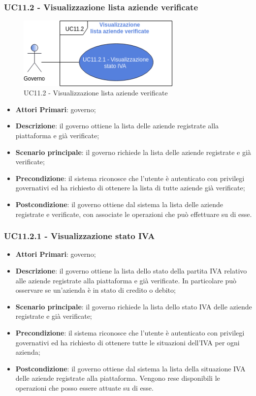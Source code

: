  \subsubsection{UC11.2 - Visualizzazione lista aziende verificate}
  \begin{figure}[h]
 	\includegraphics[width=8cm]{res/images/UC11-2.png} %
 	\centering
 	\caption{UC11.2 - Visualizzazione lista aziende verificate}
 	
 \end{figure}
 \begin{itemize}
	\item \textbf{Attori Primari}: governo;
	\item \textbf{Descrizione}: il governo ottiene la lista delle aziende registrate alla piattaforma e già verificate;
	\item \textbf{Scenario principale}: il governo richiede la lista delle aziende registrate e  già verificate;
	\item \textbf{Precondizione}: il sistema riconosce che l'utente è autenticato con privilegi governativi ed ha richiesto di ottenere la lista di tutte aziende già verificate;
	\item \textbf{Postcondizione}: il governo ottiene dal sistema la lista delle aziende registrate e verificate, con associate le operazioni che può effettuare su di esse.
\end{itemize}
\subsubsection{UC11.2.1 - Visualizzazione stato IVA}
\begin{itemize}
	\item \textbf{Attori Primari}: governo;
	\item \textbf{Descrizione}: il governo ottiene la lista dello stato della partita IVA relativo alle aziende registrate alla piattaforma e già verificate. In particolare può osservare se un'azienda è in stato di credito o debito;
	\item \textbf{Scenario principale}: il governo richiede la lista dello stato IVA delle aziende registrate e  già verificate;
	\item \textbf{Precondizione}: il sistema riconosce che l'utente è autenticato con privilegi governativi ed ha richiesto di ottenere tutte le situazioni dell'IVA per ogni azienda;
	\item \textbf{Postcondizione}: il governo ottiene dal sistema la lista della situazione IVA delle aziende registrate alla piattaforma. Vengono rese disponibili le operazioni che posso essere attuate su di esse.
\end{itemize}
